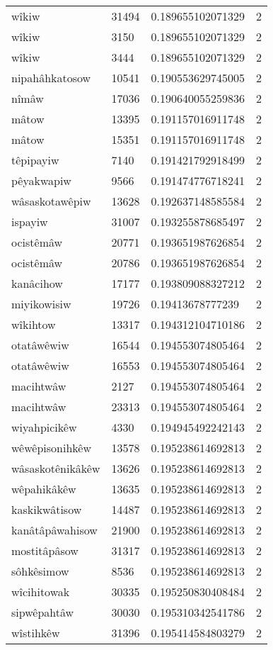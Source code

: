 \begin{longtable}{llll}
wîkiw & 31494 & 0.189655102071329 & 2 \\
wîkiw & 3150 & 0.189655102071329 & 2 \\
wîkiw & 3444 & 0.189655102071329 & 2 \\
nipahâhkatosow & 10541 & 0.190553629745005 & 2 \\
nîmâw & 17036 & 0.190640055259836 & 2 \\
mâtow & 13395 & 0.191157016911748 & 2 \\
mâtow & 15351 & 0.191157016911748 & 2 \\
têpipayiw & 7140 & 0.191421792918499 & 2 \\
pêyakwapiw & 9566 & 0.191474776718241 & 2 \\
wâsaskotawêpiw & 13628 & 0.192637148585584 & 2 \\
ispayiw & 31007 & 0.193255878685497 & 2 \\
ocistêmâw & 20771 & 0.193651987626854 & 2 \\
ocistêmâw & 20786 & 0.193651987626854 & 2 \\
kanâcihow & 17177 & 0.193809088327212 & 2 \\
miyikowisiw & 19726 & 0.19413678777239 & 2 \\
wîkihtow & 13317 & 0.194312104710186 & 2 \\
otatâwêwiw & 16544 & 0.194553074805464 & 2 \\
otatâwêwiw & 16553 & 0.194553074805464 & 2 \\
macihtwâw & 2127 & 0.194553074805464 & 2 \\
macihtwâw & 23313 & 0.194553074805464 & 2 \\
wiyahpicikêw & 4330 & 0.194945492242143 & 2 \\
wêwêpisonihkêw & 13578 & 0.195238614692813 & 2 \\
wâsaskotênikâkêw & 13626 & 0.195238614692813 & 2 \\
wêpahikâkêw & 13635 & 0.195238614692813 & 2 \\
kaskikwâtisow & 14487 & 0.195238614692813 & 2 \\
kanâtâpâwahisow & 21900 & 0.195238614692813 & 2 \\
mostitâpâsow & 31317 & 0.195238614692813 & 2 \\
sôhkêsimow & 8536 & 0.195238614692813 & 2 \\
wîcihitowak & 30335 & 0.195250830408484 & 2 \\
sipwêpahtâw & 30030 & 0.195310342541786 & 2 \\
wîstihkêw & 31396 & 0.195414584803279 & 2 \\

\end{longtable}
